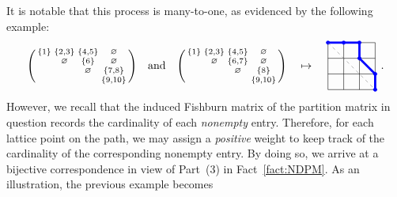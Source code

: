 \documentclass[12pt,reqno]{amsart}
\numberwithin{equation}{section}
\theoremstyle{theorem}
\theoremstyle{definition}
\theoremstyle{named}
\begin{document}
It is notable that this process is many-to-one, as evidenced by the following example:
\begin{align*}
	\begin{psmallmatrix}
		\{1\} & \{2,3\} & \{4,5\} & \varnothing\\
		& \varnothing & \{6\} & \varnothing\\
		& & \varnothing & \{7,8\}\\
		& & & \{9,10\}
	\end{psmallmatrix} \quad\text{and}\quad \begin{psmallmatrix}
		\{1\} & \{2,3\} & \{4,5\} & \varnothing\\
		& \varnothing & \{6,7\} & \varnothing\\
		& & \varnothing & \{8\}\\
		& & & \{9,10\}
	\end{psmallmatrix} \quad\mapsto\quad
	\vcenter{\hbox{\begin{tikzpicture}[scale=0.5]
				\draw (1,1) grid (4,4);
				\foreach\i\j in {1/4, 2/4, 3/4, 3/3, 4/2, 4/1}
				{\filldraw[blue] (\i,\j) circle(0.75ex);}
				\draw[line width=2pt,draw=blue] (1,4) -- (2,4) -- (3,4) -- (3,3) -- (4,2) -- (4,1);
				\draw[draw=gray,dashed] (1,4)--(4,1);
	\end{tikzpicture}}}\,\,.
\end{align*}
However, we recall that the induced Fishburn matrix of the partition matrix in question records the cardinality of each \emph{nonempty} entry. Therefore, for each lattice point on the path, we may assign a \emph{positive} weight to keep track of the cardinality of the corresponding nonempty entry. By doing so, we arrive at a bijective correspondence in view of Part~(3) in Fact~\ref{fact:NDPM}. As an illustration, the previous example becomes
\end{document}
